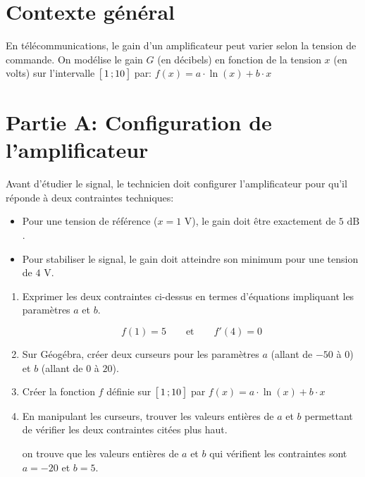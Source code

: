 \documentclass[11pt, a4paper]{report}
\begin{document}
\def\level{BTS}  %
\def\course{CIEL 1}
\def\chaptername{02} %
\def\docname{CCF Blanc}        %

\pagestyle{DS_FP}

\NomPrenomNote{}


\section*{Contexte général}

En télécommunications, le gain d'un amplificateur peut varier selon la tension de commande. On modélise le gain $G$ (en décibels) en fonction de la tension $x$ (en volts) sur l'intervalle $\bigl[ \, 1 \, ; 10 \,\bigl]$ par:
$f(x) = a \cdot \ln(x) + b \cdot x$

\section*{Partie A\@: Configuration de l'amplificateur}

Avant d'étudier le signal, le technicien doit configurer l'amplificateur pour qu'il réponde à deux contraintes techniques:

\begin{itemize}
    \item Pour une tension  de référence ($x = 1\text{ V}$), le gain doit être exactement de $5\text{ dB}$.
    \item Pour stabiliser le signal, le gain doit atteindre son minimum pour une tension de $4\text{ V}$.
\end{itemize}

\medskip

\begin{enumerate}
    \item Exprimer les deux contraintes ci-dessus en termes d'équations impliquant les paramètres $a$ et $b$.
    \begin{blocvisible}[height=1]
        \[ f(1) = 5 \qquad \text{et} \qquad      f'(4) = 0\]
    \end{blocvisible}
    \item Sur Géogébra, créer deux curseurs pour les paramètres $a$ (allant de $-50$ à $0$) et $b$ (allant de $0$ à $20$).
    \item Créer la fonction $f$ définie sur $\bigl[ \, 1 \, ; 10 \,\bigl]$ par $f(x)=a \cdot \ln(x)+b\cdot x$
    \item En manipulant les curseurs, trouver les valeurs entières de $a$ et $b$ permettant de vérifier les deux contraintes citées plus haut.
    \begin{blocvisible}[height=1]
        on trouve que les valeurs entières de $a$ et $b$ qui vérifient les contraintes sont $a = -20$ et $b = 5$.
    \end{blocvisible}
    \appelprof{}
\end{enumerate}
\end{document}
